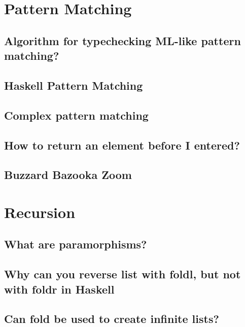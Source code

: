 \documentclass{book}%
\begin{document}
\chapter{Pattern Matching}

\section{Algorithm for typechecking ML-like pattern matching?}


\section{Haskell Pattern Matching}


\section{Complex pattern matching}


\section{How to return an element before I entered?}


\section{Buzzard Bazooka Zoom}




\chapter{Recursion}

\section{What are paramorphisms?}


\section{Why can you reverse list with foldl, but not with foldr in Haskell}


\section{Can fold be used to create infinite lists?}

\end{document}
